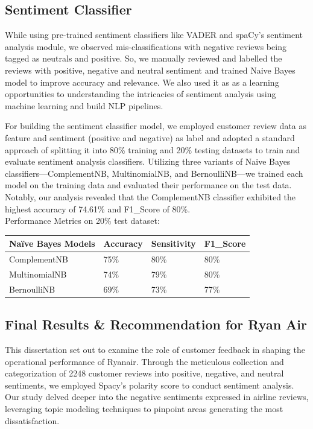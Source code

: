 \documentclass[11pt]{article} %
\begin{document}
\subsection{Sentiment Classifier}
While using pre-trained sentiment classifiers like VADER and spaCy's sentiment analysis module, we observed mis-classifications with negative reviews being tagged as neutrals and positive. So, we manually reviewed and labelled the reviews with positive, negative and neutral sentiment and trained Naive Bayes model to improve accuracy and relevance. We also used it as as a learning opportunities to understanding the intricacies of sentiment analysis using machine learning and build NLP pipelines.

For building the sentiment classifier model, we employed customer review data as feature and sentiment (positive and negative) as label and adopted a standard approach of splitting it into 80\% training and 20\% testing datasets to train and evaluate sentiment analysis classifiers. Utilizing three variants of Naive Bayes classifiers—ComplementNB, MultinomialNB, and BernoulliNB—we trained each model on the training data and evaluated their performance on the test data. Notably, our analysis revealed that the ComplementNB classifier exhibited the highest accuracy of 74.61\% and F1\_Score of 80\%.\\
Performance Metrics on 20\% test dataset:
\begin{table}[H]
\centering
\begin{tabular}{@{}llll@{}}
\toprule
\textbf{Naïve   Bayes Models}        & \textbf{Accuracy} & \textbf{Sensitivity} & \textbf{F1\_Score} \\ \midrule
{\color[HTML]{0D0D0D} ComplementNB}  & 75\%              & 80\%                 & 80\%               \\
{\color[HTML]{0D0D0D} MultinomialNB} & 74\%              & 79\%                 & 80\%               \\
{\color[HTML]{0D0D0D} BernoulliNB}   & 69\%              & 73\%                 & 77\%               \\ \bottomrule
\end{tabular}
\end{table}
\subsection{Final Results \& Recommendation for Ryan Air}
This dissertation set out to examine the role of customer feedback in shaping the operational performance of Ryanair. Through the meticulous collection and categorization of 2248 customer reviews into positive, negative, and neutral sentiments, we employed Spacy's polarity score to conduct sentiment analysis. Our study delved deeper into the negative sentiments expressed in airline reviews, leveraging topic modeling techniques to pinpoint areas generating the most dissatisfaction.
\end{document}
